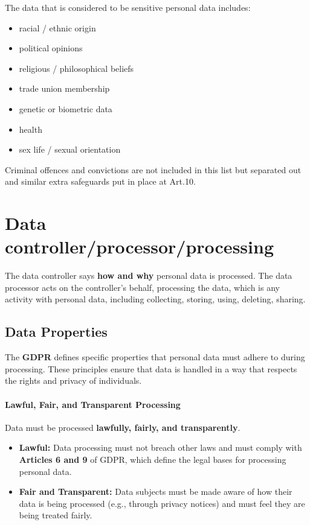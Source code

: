 The data that is considered to be sensitive personal data includes:
\begin{itemize}
  \item racial / ethnic origin
  \item political opinions
  \item religious / philosophical beliefs
  \item trade union membership
  \item genetic or biometric data
  \item health
  \item sex life / sexual orientation
\end{itemize}
Criminal offences and convictions are not included in this list but
separated out and similar extra safeguards put in place at Art.10.

\section{Data controller/processor/processing}
The data controller says \textbf{how and why} personal data is
processed. The data processor acts on the controller’s behalf,
processing the data, which is any activity with personal data, 
including collecting, storing, using, deleting, sharing.

\subsection{Data Properties}

The \textbf{GDPR} defines specific properties that personal data must
adhere to during processing. These principles ensure that data is
handled in a way that respects the rights and privacy of individuals.

\paragraph{Lawful, Fair, and Transparent Processing}  
Data must be processed \textbf{lawfully, fairly, and transparently}.  
\begin{itemize}
    \item \textbf{Lawful:} Data processing must not breach other laws
      and must comply with \textbf{Articles 6 and 9} of GDPR, which
      define the legal bases for processing personal data. 
    \item \textbf{Fair and Transparent:} Data subjects must be made
      aware of how their data is being processed (e.g., through
      privacy notices) and must feel they are being treated fairly.
\end{itemize}

